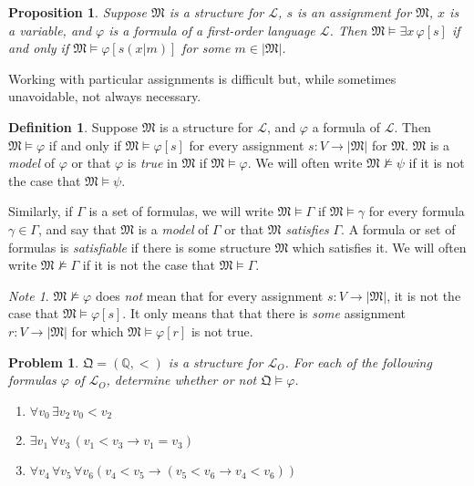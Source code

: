 \documentclass[12pt]{amsbook}
\newcommand{\nmodels}{\nvDash}
\theoremstyle{plain}
\newtheorem{prop}[thm]{Proposition}
\newtheorem{prob}[thm]{Problem}
\theoremstyle{definition}
\newtheorem{defn}{Definition}[chapter]
\theoremstyle{remark}
\newtheorem*{note}{Note}             %
\begin{document}
\begin{prop} \label{p:six5}
Suppose $\mathfrak{M}$ is a structure for $\mathcal{L}$,  $s$ is an assignment for $\mathfrak{M}$,  $x$ is a variable,  and $\varphi$ is a formula of a first-order language $\mathcal{L}$.  Then $\mathfrak{M} \models \exists x\, \varphi [s]$ if and only if $\mathfrak{M} \models \varphi [s(x|m)]$ for some $m \in |\mathfrak{M}|$.
\end{prop}

Working with particular assignments is difficult but,  while sometimes unavoidable,  not always necessary.

\begin{defn} \label{d:mod}   \index{$\models$}
Suppose $\mathfrak{M}$ is a structure for $\mathcal{L}$,  and $\varphi$ a formula of $\mathcal{L}$.  Then $\mathfrak{M} \models \varphi$ if and only if $\mathfrak{M} \models \varphi [s]$ for every assignment $s : V \to |\mathfrak{M}|$ for $\mathfrak{M}$.  $\mathfrak{M}$ is a {\em model\/} of $\varphi$ or that $\varphi$ is {\em true\/} in $\mathfrak{M}$ if $\mathfrak{M} \models \varphi$.  We will often write $\mathfrak{M} \nmodels \psi$ if it is not the case that $\mathfrak{M} \models \psi$. 

Similarly,  if $\Gamma$ is a set of formulas,  we will write $\mathfrak{M} \models \Gamma$ if $\mathfrak{M} \models \gamma$ for every formula $\gamma \in \Gamma$,  and say that $\mathfrak{M}$ is a {\em model\/} of $\Gamma$ or that $\mathfrak{M}$ {\em satisfies\/} $\Gamma$.  A formula or set of formulas is {\em satisfiable\/} if there is some structure $\mathfrak{M}$ which satisfies it.  We will often write $\mathfrak{M} \nmodels \Gamma$ if it is not the case that $\mathfrak{M} \models \Gamma$.\index{$\nmodels$}
\end{defn}

\begin{note}
$\mathfrak{M} \nmodels \varphi$ does {\em not\/} mean that for every assignment $s : V \to |\mathfrak{M}|$,  it is not the case that $\mathfrak{M} \models \varphi [s]$.  It only means that that there is {\em some\/} assignment $r : V \to |\mathfrak{M}|$ for which $\mathfrak{M} \models \varphi [r]$ is not true.
\end{note}

\begin{prob} \label{p:ord}
$\mathfrak{Q} = (\mathbb{Q},<)$ is a structure for  $\mathcal{L}_O$.  For each of the following formulas $\varphi$ of $\mathcal{L}_O$,  determine whether or not $\mathfrak{Q} \models \varphi$.
\begin{enumerate}
\item $\forall v_0\, \exists v_2\, v_0 < v_2$
\item $\exists v_1\, \forall v_3\, (v_1 < v_3 \to v_1 = v_3)$
\item $\forall v_4\, \forall v_5\, \forall v_6 (v_4 < v_5 \to (v_5 < v_6 \to v_4 < v_6))$
\end{enumerate}
\end{prob}
\end{document}
